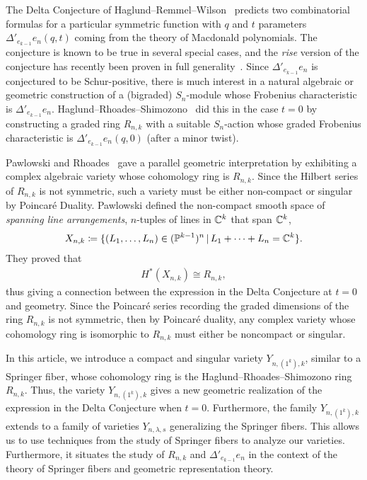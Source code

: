 \documentclass[12pt]{amsart}
\newcommand{\st}{\,|\,}
\begin{document}
The Delta Conjecture of Haglund--Remmel--Wilson~\cite{HRW} predicts two combinatorial formulas for a particular symmetric function with $q$ and $t$ parameters $\Delta'_{e_{k-1}} e_n(q, t)$ coming from the theory of Macdonald polynomials. The conjecture is known to be true in several special cases, and the \emph{rise} version of the conjecture has recently been proven in full generality~\cite{DM}. Since $\Delta'_{e_{k-1}} e_n$ is conjectured to be Schur-positive, there is much interest in a natural algebraic or geometric construction of a (bigraded) $S_n$-module whose Frobenius characteristic is $\Delta'_{e_{k-1}} e_n$. Haglund--Rhoades--Shimozono~\cite{HRS1} did this in the case $t=0$ by constructing a graded ring $R_{n,k}$ with a suitable $S_n$-action whose graded Frobenius characteristic is $\Delta'_{e_{k-1}} e_n(q, 0)$ (after a minor twist).

Pawlowski and Rhoades~\cite{Pawlowski-Rhoades} gave a parallel geometric interpretation by exhibiting a complex algebraic variety whose cohomology ring is $R_{n,k}$. Since the Hilbert series of $R_{n,k}$ is not symmetric, such a variety must be either non-compact or singular by Poincar\'e Duality. Pawlowski defined the non-compact smooth space of \emph{spanning line arrangements}, $n$-tuples of lines in $\mathbb{C}^k$ that span $\mathbb{C}^k$,
\begin{align}
X_{n,k} \coloneqq \{(L_1,\dots, L_n) \in (\bP^{k-1})^n \st L_1+\cdots +L_n = \bC^k\}.
\end{align}
They proved that 
\begin{align}
H^*(X_{n,k}) \cong R_{n,k},
\end{align}
thus giving a connection between the expression in the Delta Conjecture at $t=0$ and geometry. 
Since the Poincar\'e series recording the graded dimensions of the ring $R_{n,k}$ is not symmetric, then by Poincar\'e duality, any complex variety whose cohomology ring is isomorphic to $R_{n,k}$ must either be noncompact or singular. 

In this article, we introduce a compact and singular variety $Y_{n,(1^k),k}$, similar to a Springer fiber, whose cohomology ring is the Haglund--Rhoades--Shimozono ring $R_{n,k}$. Thus, the variety $Y_{n,(1^k),k}$ gives a new geometric realization of the expression in the Delta Conjecture when $t=0$. Furthermore, the family $Y_{n,(1^k),k}$ extends to a family of varieties $Y_{n,\lambda,s}$ generalizing the Springer fibers. This allows us to use techniques from the study of Springer fibers to analyze our varieties. Furthermore, it situates the study of $R_{n,k}$ and $\Delta'_{e_{k-1}}e_n$ in the context of the theory of Springer fibers and geometric representation theory.
\end{document}
